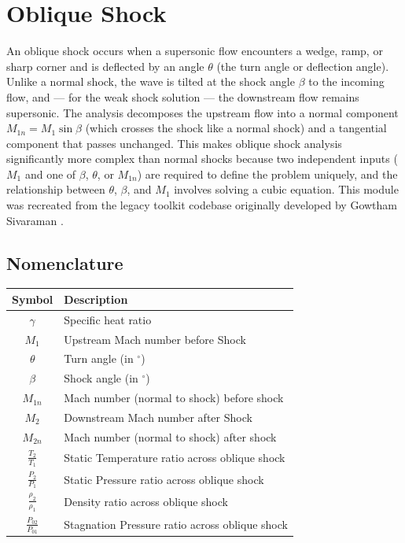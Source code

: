 \chapter{Oblique Shock}

An oblique shock occurs when a supersonic flow encounters a wedge, ramp, or sharp corner and is deflected by an angle $\theta$ (the turn angle or deflection angle). Unlike a normal shock, the wave is tilted at the shock angle $\beta$ to the incoming flow, and --- for the weak shock solution --- the downstream flow remains supersonic. The analysis decomposes the upstream flow into a normal component $M_{1n} = M_1 \sin\beta$ (which crosses the shock like a normal shock) and a tangential component that passes unchanged. This makes oblique shock analysis significantly more complex than normal shocks because two independent inputs ($M_1$ and one of $\beta$, $\theta$, or $M_{1n}$) are required to define the problem uniquely, and the relationship between $\theta$, $\beta$, and $M_1$ involves solving a cubic equation. This module was recreated from the legacy toolkit codebase originally developed by Gowtham Sivaraman \cite{sivaraman2015}.

\section{Nomenclature}

\begin{center}
\begin{tabular}{@{}cl@{}}
\toprule
Symbol & Description \\
\midrule
$\gamma$ & Specific heat ratio \\
$M_1$ & Upstream Mach number before Shock \\
$\theta$ & Turn angle (in $^\circ$) \\
$\beta$ & Shock angle (in $^\circ$) \\
$M_{1n}$ & Mach number (normal to shock) before shock \\
$M_2$ & Downstream Mach number after Shock \\
$M_{2n}$ & Mach number (normal to shock) after shock \\
$\frac{T_2}{T_1}$ & Static Temperature ratio across oblique shock \\
$\frac{P_2}{P_1}$ & Static Pressure ratio across oblique shock \\
$\frac{\rho_2}{\rho_1}$ & Density ratio across oblique shock \\
$\frac{P_{02}}{P_{01}}$ & Stagnation Pressure ratio across oblique shock \\
\bottomrule
\end{tabular}
\end{center}

